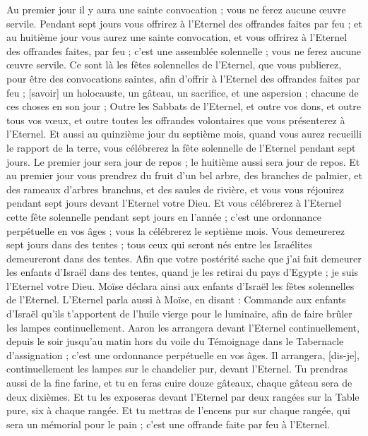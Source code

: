 \begin{multicols}{2}
Au premier jour il y aura une sainte convocation ; vous ne ferez aucune œuvre servile.
Pendant sept jours vous offrirez à l'Eternel des offrandes faites par feu ; et au huitième jour vous aurez une sainte convocation, et vous offrirez à l'Eternel des offrandes faites, par feu ; c'est une assemblée solennelle ; vous ne ferez aucune œuvre servile.
Ce sont là les fêtes solennelles de l'Eternel, que vous publierez, pour être des convocations saintes, afin d'offrir à l'Eternel des offrandes faites par feu ; [savoir] un holocauste, un gâteau, un sacrifice, et une aspersion ; chacune de ces choses en son jour ;
Outre les Sabbats de l'Eternel, et outre vos dons, et outre tous vos vœux, et outre toutes les offrandes volontaires que vous présenterez à l'Eternel.
Et aussi au quinzième jour du septième mois, quand vous aurez recueilli le rapport de la terre, vous célébrerez la fête solennelle de l'Eternel pendant sept jours. Le premier jour sera jour de repos ; le huitième aussi sera jour de repos.
Et au premier jour vous prendrez du fruit d'un bel arbre, des branches de palmier, et des rameaux d'arbres branchus, et des saules de rivière, et vous vous réjouirez pendant sept jours devant l'Eternel votre Dieu.
Et vous célébrerez à l'Eternel cette fête solennelle pendant sept jours en l'année ; c'est une ordonnance perpétuelle en vos âges ; vous la célébrerez le septième mois.
Vous demeurerez sept jours dans des tentes ; tous ceux qui seront nés entre les Israélites demeureront dans des tentes.
Afin que votre postérité sache que j'ai fait demeurer les enfants d'Israël dans des tentes, quand je les retirai du pays d'Egypte ; je suis l'Eternel votre Dieu.
Moïse déclara ainsi aux enfants d'Israël les fêtes solennelles de l'Eternel.
\VerseOne{}L'Eternel parla aussi à Moïse, en disant :
Commande aux enfants d'Israël qu'ils t'apportent de l'huile vierge pour le luminaire, afin de faire brûler les lampes continuellement.
Aaron les arrangera devant l'Eternel continuellement, depuis le soir jusqu'au matin hors du voile du Témoignage dans le Tabernacle d'assignation ; c'est une ordonnance perpétuelle en vos âges.
Il arrangera, [dis-je], continuellement les lampes sur le chandelier pur, devant l'Eternel.
Tu prendras aussi de la fine farine, et tu en feras cuire douze gâteaux, chaque gâteau sera de deux dixièmes.
Et tu les exposeras devant l'Eternel par deux rangées sur la Table pure, six à chaque rangée.
Et tu mettras de l'encens pur sur chaque rangée, qui sera un mémorial pour le pain ; c'est une offrande faite par feu à l'Eternel.

\end{multicols}
